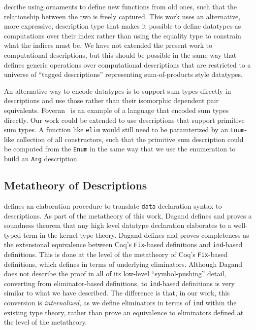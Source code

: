 \documentclass[preprint,nonatbib]{sigplanconf}
\begin{document}
\citet{dagand2012transporting} decribe using ornaments
to define new functions from old ones, such that the
relationship between the two is freely captured.
This work uses an alternative, more expressive, description
type that makes it possible to define datatypes as computations over
their index rather than using the equality type to constrain what the
indices must be. We have not extended the present work to
computational descriptions, but this should be possible in the same
way that \citet{dagand:phd} defines generic operations over
computational descriptions that are restricted to a universe of
``tagged descriptions'' representing sum-of-products style datatypes.

An alternative way to encode datatypes is to
support sum types directly in descriptions and use those rather than
their isomorphic dependent pair equivalents. Foveran~\citep{foveran} is
an example of a language that encoded sum types directly. Our work
could be extended to use descriptions that support primitive sum
types. A function like {\tt elim} would still need to be paramterized
by an {\tt Enum}-like collection of all constructors, such that the
primitive sum description could be computed from the {\tt Enum} in the
same way that we use the enumeration to build an {\tt Arg}
description.

\subsection{Metatheory of Descriptions}

\citet{dagand:phd} defines an elaboration procedure to translate
{\tt data} declaration syntax to descriptions. As part of the
metatheory of this work, Dagand defines and proves a soundness theorem
that any high level datatype declaration elaborates to a well-typed
term in the kernel type theory. Dagand defines and proves completeness as the
extensional equivalence between {\sc Coq}'s {\tt Fix}-based
definitions and {\tt ind}-based definitions. This is done at the level
of the metatheory of {\sc Coq}'s {\tt Fix}-based definitions, which
\citet{gimenez1995codifying} defines in terms of underlying
eliminators. Although Dagand does not describe the proof in all of its
low-level ``symbol-pushing'' detail, converting from
eliminator-based definitions, to {\tt ind}-based definitions is very similar
to what we have described. The difference is that, in our work, this
conversion is {\it internalized}, as we define eliminators in terms of
{\tt ind} within the existing type theory, rather than prove an
equivalence to eliminators defined at the level of the metatheory.
\end{document}
